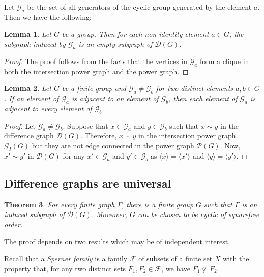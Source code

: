 \documentclass[12pt]{amsart}
\theoremstyle{plain}
\newtheorem{theorem}{Theorem}[section]
\newtheorem{lemma}[theorem]{Lemma}
\theoremstyle{remark}
\theoremstyle{definition}
\begin{document}
Let $\mathcal{G}_a$ be the set of all generators of the cyclic group generated
by the element $a$. Then we have the following:
\begin{lemma}\label{l:gens_null}
Let $G$ be a group. Then for each non-identity element $a\in G$, the subgraph induced by $\mathcal{G}_a$ is an empty subgraph of $\mathcal{D}(G)$.
\end{lemma}

\begin{proof}
The proof follows from the facts that the vertices in $\mathcal{G}_a$ form a clique in both the intersection power graph and the power graph.   
\end{proof}

\begin{lemma}\label{l:blowup}
Let $G$ be a finite group and $\mathcal{G}_a\neq \mathcal{G}_b$ for two distinct elements $a, b \in G$. If an element of $\mathcal{G}_a$ is adjacent to an element of $\mathcal{G}_b$, then each element of $\mathcal{G}_a$ is adjacent to every element of $\mathcal{G}_b$.    
\end{lemma}

\begin{proof}
Let $\mathcal{G}_a\neq \mathcal{G}_b$. Suppose that $x\in \mathcal{G}_a$ and $y\in \mathcal{G}_b$ such that $x\sim y$ in the difference graph $\mathcal{D}(G).$ Therefore, $x\sim y$ in the intersection power graph $\mathcal{G}_I(G)$ but they are not edge connected in the power graph $\mathcal{P}(G).$ Now, $x'\sim y'$ in $\mathcal{D}(G)$ for any $x'\in \mathcal{G}_a$ and $y'\in \mathcal{G}_b$ as $\langle x\rangle=\langle x'\rangle$ and $\langle y\rangle=\langle y'\rangle.$  
\end{proof}

\subsection{Difference graphs are universal}

\begin{theorem}\label{t:univ}
For every finite graph $\Gamma$, there is a finite group $G$ such that
$\Gamma$ is an induced subgraph of $\mathcal{D}(G)$. Moreover, $G$ can be
chosen to be cyclic of squarefree order.
\end{theorem}

The proof depends on two results which may be of independent interest.

Recall that a \emph{Sperner family} is a family $\mathcal{F}$ of subsets of
a finite set $X$ with the property that, for any two distinct sets
$F_1,F_2\in\mathcal{F}$, we have $F_1\not\subseteq F_2$.
\end{document}
